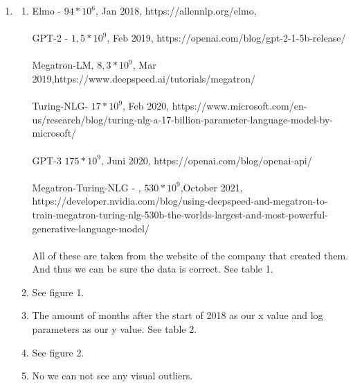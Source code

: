 \documentclass[a4paper]{article}
\begin{document}
\begin{enumerate}
    \item \begin{enumerate}
        \item Elmo - $94*10^6$, Jan 2018,  https://allennlp.org/elmo, \\ \\
              GPT-2 - $1,5*10^9$, Feb 2019, https://openai.com/blog/gpt-2-1-5b-release/ \\ \\
              Megatron-LM, $8,3*10^9$, Mar 2019,https://www.deepspeed.ai/tutorials/megatron/ \\ \\
              Turing-NLG- $17*10^9$, Feb 2020, https://www.microsoft.com/en-us/research/blog/turing-nlg-a-17-billion-parameter-language-model-by-microsoft/ \\ \\
              GPT-3 $175*10^9$, Juni 2020, https://openai.com/blog/openai-api/ \\ \\
              Megatron-Turing-NLG - , $530*10^9$,October 2021, https://developer.nvidia.com/blog/using-deepspeed-and-megatron-to-train-megatron-turing-nlg-530b-the-worlds-largest-and-most-powerful-generative-language-model/  \\ \\ 
              All of these are taken from the website of the company that created them. And thus we can be sure the data is correct. See table 1.
            \item See figure 1.
            \item The amount of months after the start of 2018 as our x value and log parameters as our y value. See table 2.
            \item See figure 2. 
            \item No we can not see any visual outliers. 


\end{enumerate}
\end{enumerate}
\end{document}
